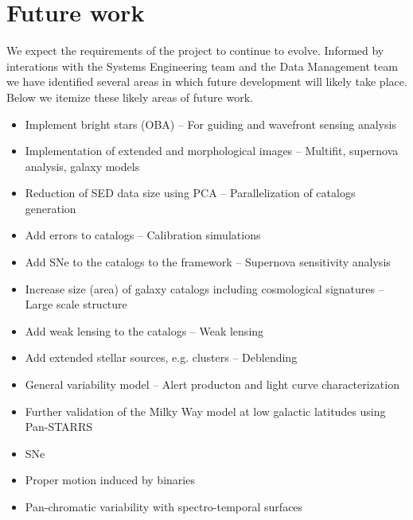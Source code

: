 \documentclass[]{article}
\begin{document}
\section{Future work}
We expect the requirements of the project to continue to evolve.  Informed by interations with the Systems Engineering team and the Data Management team we have 
identified several areas in which future development will likely take place.  Below we itemize these likely areas of future work.
\begin{itemize}
\item Implement bright stars (OBA) -- For guiding and wavefront sensing analysis
\item Implementation of extended and morphological images -- Multifit, supernova analysis, galaxy models
\item Reduction of SED data size using PCA -- Parallelization of catalogs generation
\item Add errors to catalogs -- Calibration simulations
\item Add SNe to the catalogs to the framework -- Supernova sensitivity analysis
\item Increase size (area) of galaxy catalogs including cosmological signatures -- Large scale structure
\item Add weak lensing to the catalogs -- Weak lensing
\item Add extended stellar sources, e.g. clusters -- Deblending
\item General variability model -- Alert producton and light curve characterization
\item Further validation of the Milky Way model at low galactic latitudes using Pan-STARRS
\item SNe
\item Proper motion induced by binaries
\item Pan-chromatic variability with spectro-temporal surfaces
\end{itemize}


\end{document}
